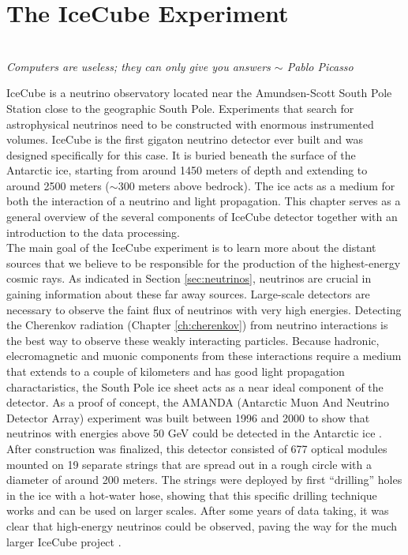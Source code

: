 \chapter{The IceCube Experiment}
\label{ch:icecube}
\begin{flushright}
\textit{\\Computers are useless; they can only give you answers $\sim$ Pablo Picasso\\}
\end{flushright}
IceCube is a neutrino observatory located near the Amundsen-Scott South Pole Station close to the geographic South Pole. Experiments that search for astrophysical neutrinos need to be constructed with enormous instrumented volumes. IceCube is the first gigaton neutrino detector ever built and was designed specifically for this case. It is buried beneath the surface of the Antarctic ice, starting from around 1450 meters of depth and extending to around 2500 meters ($\sim$300 meters above bedrock). The ice acts as a medium for both the interaction of a neutrino and light propagation. This chapter serves as a general overview of the several components of IceCube detector together with an introduction to the data processing.\\
\newline
\noindent The main goal of the IceCube experiment is to learn more about the distant sources that we believe to be responsible for the production of the highest-energy cosmic rays. As indicated in Section \ref{sec:neutrinos}, neutrinos are crucial in gaining information about these far away sources. Large-scale detectors are necessary to observe the faint flux of neutrinos with very high energies. Detecting the Cherenkov radiation (Chapter \ref{ch:cherenkov}) from neutrino interactions is the best way to observe these weakly interacting particles. Because hadronic, elecromagnetic and muonic components from these interactions require a medium that extends to a couple of kilometers and has good light propagation charactaristics, the South Pole ice sheet acts as a near ideal component of the detector. As a proof of concept, the AMANDA (Antarctic Muon And Neutrino Detector Array) experiment was built between 1996 and 2000 to show that neutrinos with energies above 50 GeV could be detected in the Antarctic ice \cite{amandaurl,Andres:1999hm}. After construction was finalized, this detector consisted of 677 optical modules mounted on 19 separate strings that are spread out in a rough circle with a diameter of around 200 meters. The strings were deployed by first ``drilling'' holes in the ice with a hot-water hose, showing that this specific drilling technique works and can be used on larger scales. After some years of data taking, it was clear that high-energy neutrinos could be observed, paving the way for the much larger IceCube project \cite{Ahrens:2002gq}.


